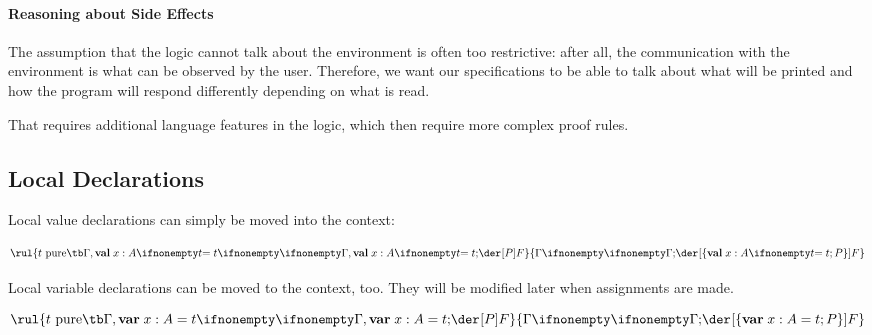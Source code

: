 \paragraph{Reasoning about Side Effects}
The assumption that the logic cannot talk about the environment is often too restrictive: after all, the communication with the environment is what can be observed by the user.
Therefore, we want our specifications to be able to talk about what will be printed and how the program will respond differently depending on what is read.

That requires additional language features in the logic, which then require more complex proof rules.

\subsection{Local Declarations}

Local value declarations can simply be moved into the context:

\[\rul{t\text{ pure}\tb\iscons{}{\Gamma,\aval{x}{A}{t}}{}{\abox{P}{F}}}
      {\iscons{}{\Gamma}{}{\abox{\{\aval{x}{A}{t}; P\}}{F}}}
\]

Local variable declarations can be moved to the context, too. They will be modified later when assignments are made.

\[\rul{t\text{ pure}\tb\iscons{}{\Gamma,\amval{x}{A}{t}}{}{\abox{P}{F}}}
      {\iscons{}{\Gamma}{}{\abox{\{\amval{x}{A}{t}; P\}}{F}}}
\]
